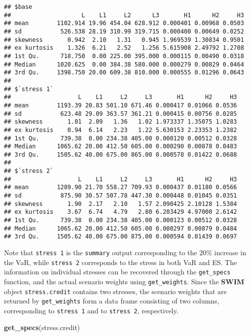 \documentclass[
]{article}
\newenvironment{Shaded}{\begin{snugshade}}{\end{snugshade}}
\newcommand{\KeywordTok}[1]{\textcolor[rgb]{0.13,0.29,0.53}{\textbf{#1}}}
\newcommand{\NormalTok}[1]{#1}
\begin{document}
\begin{verbatim}
## $base
##                    L    L1     L2      L3       H1      H2     H3
## mean        1102.914 19.96 454.04 628.912 0.000401 0.00968 0.0503
## sd           526.538 28.19 310.99 319.715 0.000400 0.00649 0.0252
## skewness       0.942  2.10   1.31   0.945 1.969539 1.30834 0.9501
## ex kurtosis    1.326  6.21   2.52   1.256 5.615908 2.49792 1.2708
## 1st Qu.      718.750  0.00 225.00 395.000 0.000115 0.00490 0.0318
## Median      1020.625  0.00 384.38 580.000 0.000279 0.00829 0.0464
## 3rd Qu.     1398.750 20.00 609.38 810.000 0.000555 0.01296 0.0643
## 
## $`stress 1`
##                   L    L1     L2     L3       H1      H2     H3
## mean        1193.39 20.83 501.10 671.46 0.000417 0.01066 0.0536
## sd           623.48 29.09 363.57 361.21 0.000415 0.00756 0.0285
## skewness       1.01  2.09   1.36   1.02 1.973337 1.35075 1.0283
## ex kurtosis    0.94  6.14   2.23   1.22 5.630153 2.23353 1.2382
## 1st Qu.      739.38  0.00 234.38 405.00 0.000120 0.00512 0.0328
## Median      1065.62 20.00 412.50 605.00 0.000290 0.00878 0.0483
## 3rd Qu.     1505.62 40.00 675.00 865.00 0.000578 0.01422 0.0688
## 
## $`stress 2`
##                   L    L1     L2     L3       H1      H2     H3
## mean        1289.90 21.70 558.27 709.93 0.000437 0.01180 0.0566
## sd           875.90 30.57 507.78 447.30 0.000448 0.01045 0.0351
## skewness       1.90  2.17   2.10   1.57 2.090425 2.10128 1.5384
## ex kurtosis    3.67  6.74   4.79   2.80 6.203429 4.97000 2.6142
## 1st Qu.      739.38  0.00 234.38 405.00 0.000123 0.00512 0.0328
## Median      1065.62 20.00 412.50 605.00 0.000297 0.00879 0.0484
## 3rd Qu.     1505.62 40.00 675.00 875.00 0.000594 0.01439 0.0697
\end{verbatim}

Note that \texttt{stress\ 1} is the \texttt{summary} output corresponding to the \(20\%\) increase in the VaR, while \texttt{stress\ 2} corresponds to the stress in both VaR and ES. The information on individual stresses can be recovered through the \texttt{get\_specs} function, and the actual scenario weights using \texttt{get\_weights}. Since the \textbf{SWIM} object \texttt{stress.credit} contains two stresses, the scenario weights that are returned by \texttt{get\_weights} form a data frame consisting of two columns, corresponding to \texttt{stress\ 1} and to \texttt{stress\ 2}, respectively.

\begin{Shaded}
\begin{Highlighting}[]
\KeywordTok{get\_specs}\NormalTok{(stress.credit)}
\end{Highlighting}
\end{Shaded}
\end{document}
